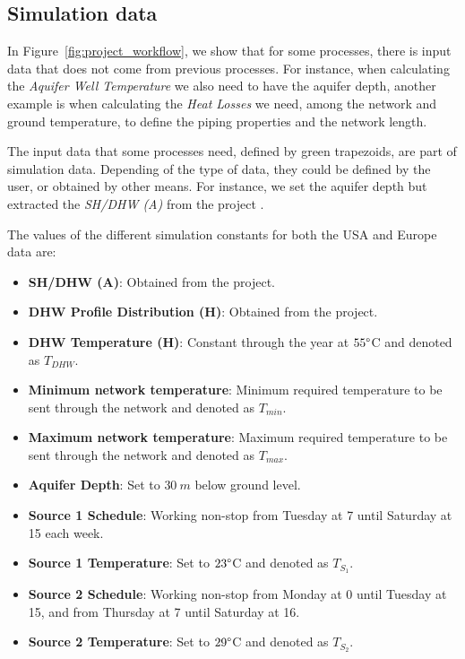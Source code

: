 \documentclass{article}
\begin{document}
\subsection{Simulation data}
\label{subsec:simulation-data}

In Figure~\ref{fig:project_workflow}, we show that for some processes, there is input data that does not come from previous processes. For instance, when calculating the \emph{Aquifer Well Temperature} we also need to have the aquifer depth, another example is when calculating the \emph{Heat Losses} we need, among the network and ground temperature, to define the piping properties and the network length.

The input data that some processes need, defined by green trapezoids, are part of simulation data. Depending of the type of data, they could be defined by the user, or obtained by other means. For instance, we set the aquifer depth but extracted the \emph{SH/DHW (A)} from the \inspire project \cite{dipasquale_chiara_2019_3256270}.

The values of the different simulation constants for both the USA and Europe data are:
\begin{itemize}
    \item \textbf{SH/DHW (A)}: Obtained from the \inspire project.
    \item \textbf{DHW Profile Distribution (H)}: Obtained from the \inspire project.
    \item \textbf{DHW Temperature (H)}: Constant through the year at $55\degree$C and denoted as $T_{DHW}$.
    \item \textbf{Minimum network temperature}: Minimum required temperature to be sent through the network and denoted as $T_{min}$.
    \item \textbf{Maximum network temperature}: Maximum required temperature to be sent through the network and denoted as $T_{max}$.
    \item \textbf{Aquifer Depth}: Set to $30\ m$ below ground level.
    \item \textbf{Source 1 Schedule}: Working non-stop from Tuesday at 7 until Saturday at 15 each week.
    \item \textbf{Source 1 Temperature}: Set to $23\degree$C and denoted as $T_{S_1}$.
    \item \textbf{Source 2 Schedule}: Working non-stop from Monday at 0 until Tuesday at 15, and from Thursday at 7 until Saturday at 16.
    \item \textbf{Source 2 Temperature}: Set to $29\degree$C and denoted as $T_{S_2}$.
\end{itemize}
\end{document}

